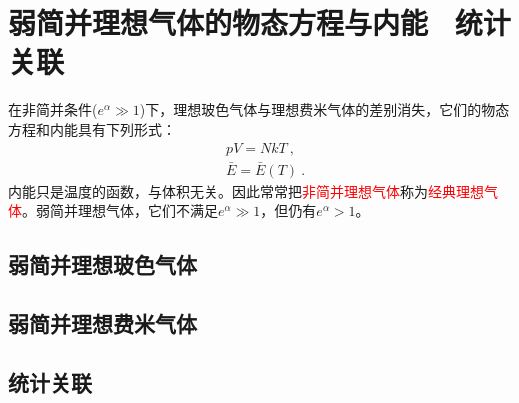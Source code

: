 \documentclass[12pt,a4paper]{article}
\begin{document}
\section{弱简并理想气体的物态方程与内能 ~统计关联}
在非简并条件($e^{\alpha} \gg 1$)下，理想玻色气体与理想费米气体的差别消失，它们的物态方程和内能具有下列形式：
\begin{align*}
& pV = Nk T ~, \\
& \bar{E} = \bar{E}(T) ~.
\end{align*}
内能只是温度的函数，与体积无关。因此常常把\textcolor{red}{非简并理想气体}称为\textcolor{red}{经典理想气体}。弱简并理想气体，它们不满足$e^{\alpha} \gg 1$，但仍有$e^{\alpha} > 1$。

\subsection{弱简并理想玻色气体}









\subsection{弱简并理想费米气体}











\subsection{统计关联}
\end{document}
